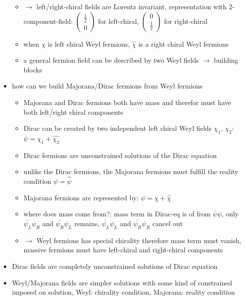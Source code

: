 \documentclass[encoding=utf8,british]{tumphthesis}
\begin{document}
\begin{itemize}
\begin{itemize}
\item \(\rightarrow\) left/right-chiral fields are Lorentz invariant, representation with 2-component-field: \( \begin{pmatrix}\frac{1}{2} \\ 0\end{pmatrix}\) for left-chiral, \(\begin{pmatrix}0 \\ \frac{1}{2}\end{pmatrix}\) for right-chiral
\item when \(\chi\) is left chiral Weyl fermions, \( \widehat{\chi} \) is a right chiral Weyl fermions
\item a general fermion field can be described by two Weyl fields \(\rightarrow\) building blocks
\end{itemize}
\item how can we build Majorana/Dirac fermions from Weyl fermions
\begin{itemize}
\item Majorana and Dirac fermions both have mass and therefor must have both left/right chiral components
\item Dirac can be created by two independent left chiral Weyl fields \(\chi_1\), \(\chi_2\): \(\psi = \chi_1 + \widehat{\chi_2}\)
\item Dirac fermions are unconstrained solutions of the Dirac equation
\item unlike the Dirac fermions, the Majorana fermions must fulfill the reality condition \( \psi = \widehat{\psi} \)
\item Majorana fermions are represented by: \( \psi = \chi + \widehat{\chi} \)
\item where does mass come from?: mass term in Dirac-eq is of from \(\bar{\psi}\psi\), only \(\bar{\psi_L}\psi_R\) and \(\bar{\psi_R}\psi_L\) remains, \(\bar{\psi_L}\psi_L\) and \(\bar{\psi_R}\psi_R\) cancel out
\item \(\rightarrow\) Weyl fermions has special chirality therefore mass term must vanish, massive fermions must have left-chiral and right-chiral components
\end{itemize}
\item Dirac fields are completely unconstrained solutions of Dirac equation
\item Weyl/Majorana fields are simpler solutions with some kind of constrained imposed on solution, Weyl: chirality condition, Majorana: reality condition
\end{itemize}
\end{document}
